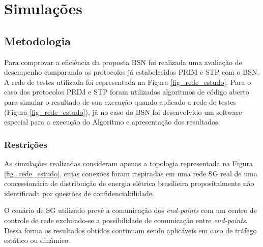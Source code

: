 \documentclass[12pt]{article}
\begin{document}
\section{Simulações}
\label{sec:simulacoes}

\subsection{Metodologia}

Para comprovar a eficiência da proposta BSN foi realizada uma avaliação de desempenho comparando os protocolos já estabelecidos PRIM e STP com o BSN. A rede de testes utilizada foi representada na Figura \ref{fig_rede_estudo}. Para o caso dos protocolos PRIM e STP foram utilizados algoritmos de código aberto para simular o resultado de sua execução quando aplicado a rede de testes (Figura \ref{fig_rede_estudo}), já no caso do BSN foi desenvolvido um software especial para a execução do Algoritmo e apresentação dos resultados.

\subsubsection{Restrições}

As simulações realizadas consideram apenas a topologia representada na Figura \ref{fig_rede_estudo}, cujas conexões foram inspiradas em uma rede SG real de uma concessionária de distribuição de energia elétrica brasilieira propositalmente não identificada por questões de confidenciabilidade.

O cenário de SG utilizado prevê a comunicação dos \emph{end-points} com um centro de controle de rede excluindo-se a possibilidade de comunicação entre \emph{end-points}. Dessa forma os resultados obtidos continuam sendo aplicáveis em caso de tráfego estático ou dinâmico.

\end{document}
